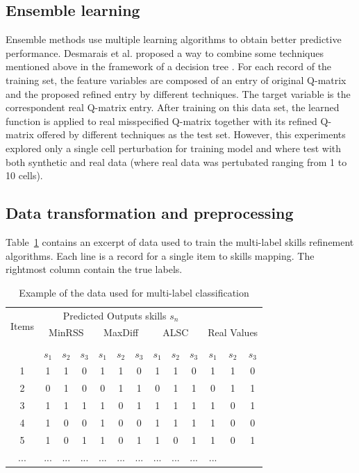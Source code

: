 \documentclass[11pt]{article}
\begin{document}
\subsection{Ensemble learning}

Ensemble methods use multiple learning algorithms to obtain better predictive performance. Desmarais et al. proposed a way to combine some techniques mentioned above in the framework of a decision tree \cite{desmarais2015combining}. For each record of the training set, the feature variables are composed of an entry of original Q-matrix and the proposed refined entry by different techniques. The target variable is the correspondent real Q-matrix entry. After training on this data set, the learned function is applied to real misspecified Q-matrix together with its refined Q-matrix offered by different techniques as the test set. However, this experiments explored only a single cell perturbation for training model and where test with both synthetic and real data (where real data was pertubated ranging from 1 to 10 cells).

\subsection{Data transformation and preprocessing}

Table~\ref{ref:data} contains an excerpt of data used to train the multi-label skills refinement algorithms.  Each line is a record for a single item to skills mapping.
The rightmost column contain the true labels. 
\begin{table}
\centering
	\begin{tabular}{c|ccccccccc|ccc}	
\toprule
\multirow{3}{*}{Items} & \multicolumn{9}{c}{Predicted Outputs skills $s_n$}\\
\cmidrule{2-9}
& \multicolumn{3}{c}{ MinRSS } & \multicolumn{3}{c}{MaxDiff}&\multicolumn{3}{c|}{ALSC}& \multicolumn{3}{c}{Real Values} \\ \\
\cmidrule{2-9}
& $s_1$ & $s_2$ & $s_3$ & $s_1$ & $s_2$ & $s_3$ & $s_1$ & $s_2$ & $s_3$  & \textbf{$s_1$} & \textbf{$s_2$} & \textbf{$s_3$}\\ \hline

	1 & 1 & 1 & 0 & 1 & 1 & 0 & 1 & 1 & 0  & 1 & 1 & 0 \\
	2 & 0 & 1 & 0 & 0 & 1 & 1 & 0 & 1 & 1 & 0 & 1 & 1 \\
	3 & 1 & 1 & 1 & 1 & 0 & 1 &1 & 1 & 1 & 1 & 0 & 1\\
	4 & 1 & 0 & 0 & 1 & 0 & 0 & 1 & 1 & 1 & 1 & 0 & 0 \\
	5 & 1 & 0 & 1 & 1 & 0 & 1 & 1 & 0 & 1  & 1 & 0 & 1\\
	... &... &... &... &... &... &... &... &... &... &...\\
	 \hline\hline
       
	\end{tabular}

\caption{Example of the data used for multi-label classification} \label{ref:data} 
\end{table}
\end{document}
